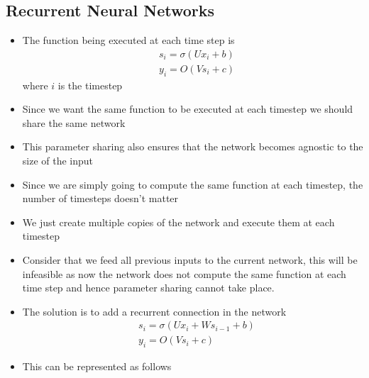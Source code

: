 \documentclass[a4paper]{article}
\begin{document}
\subsection{Recurrent Neural Networks}
\begin{itemize}
    \item The function being executed at each time step is
    \begin{equation*}
        \begin{split}
            &s_i=\sigma(Ux_i+b)\\
            &y_i=O(Vs_i+c)
        \end{split}
    \end{equation*}
    where $i$ is the timestep
    \item Since we want the same function to be executed at each timestep we should share the same network
    \item This parameter sharing also ensures that the network becomes agnostic to the size of the input
    \item Since we are simply going to compute the same function at each timestep, the number of timesteps doesn’t matter
    \item We just create multiple copies of the network and execute them at each timestep
    \item Consider that we feed all previous inputs to the current network, this will be infeasible as now the network does not compute the same function at each time step and hence parameter sharing cannot take place.
    \item The solution is to add a recurrent connection in the network
    \begin{equation*}
        \begin{split}
            &s_i=\sigma(Ux_i+Ws_{i-1}+b)\\
            &y_i=O(Vs_i+c)
        \end{split}
    \end{equation*}
    \item This can be represented as follows
    \begin{figure}[H]
        \centering
        \begin{subfigure}[b]{0.45\textwidth}
            \centering

\end{subfigure}
\end{figure}
\end{itemize}
\end{document}
